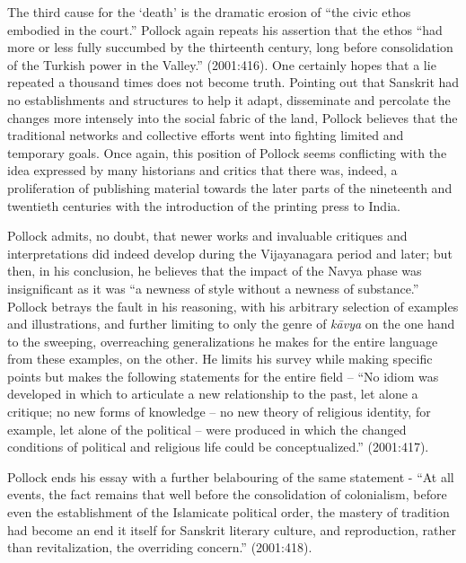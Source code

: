 The third cause for the ‘death’ is the dramatic erosion of “the civic ethos embodied in the court.” Pollock again repeats his assertion that the ethos “had more or less fully succumbed by the thirteenth century, long before consolidation of the Turkish power in the Valley.” (2001:416). One certainly hopes that a lie  repeated a thousand times does not become truth. Pointing out that Sanskrit had no establishments and structures to help it adapt, disseminate and percolate the changes more intensely into the social fabric of the land, Pollock believes that the traditional networks and collective efforts went into fighting limited and temporary goals. Once again, this position of Pollock seems conflicting with the idea expressed by many historians and critics that there was, indeed, a proliferation of publishing material towards the later parts of the nineteenth and twentieth centuries with the introduction of the printing press to India.
\newpage

Pollock admits, no doubt, that newer works and invaluable critiques and interpretations did indeed develop during the Vijayanagara period and later; but then, in his conclusion, he believes that the impact of the Navya phase was insignificant as it was “a newness of style without a newness of substance.” Pollock betrays the fault in his reasoning, with his arbitrary selection of examples and illustrations, and further limiting to only the genre of {\sl kāvya} on the one hand to the sweeping, overreaching generalizations he makes for the entire language from these examples, on the other. He limits his survey while making specific points but makes the following statements for the entire field – “No idiom was developed in which to articulate a new relationship to the past, let alone a critique; no new forms of knowledge – no new theory of religious identity, for example, let alone of the political – were produced in which the changed conditions of political and religious life could be conceptualized.” (2001:417).

Pollock ends his essay with a further belabouring of the same statement - “At all events, the fact remains that well before the consolidation of colonialism, before even the establishment of the Islamicate political order, the mastery of tradition had become an end it itself for Sanskrit literary culture, and reproduction, rather than revitalization, the overriding concern.” (2001:418).  

